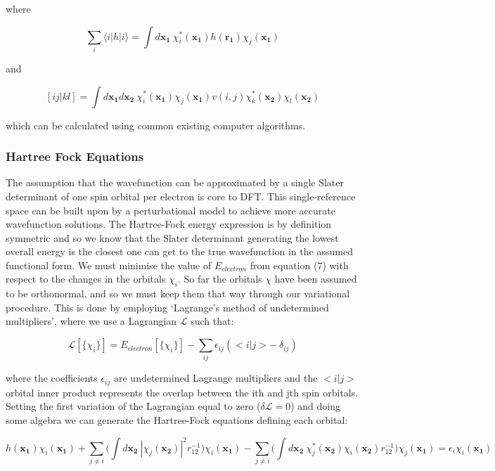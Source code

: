 \documentclass[10pt]{article}
\begin{document}
where

$$\sum_{i}\langle i|h|i\rangle = \int d\mathbf{x_1} \ \chi^*_i(\mathbf{x_1})h(\mathbf{r_1})\chi_j(\mathbf{x_1})$$

and

$$[ij|kl] = \int d\mathbf{x_1} d\mathbf{x_2} \ \chi^*_i(\mathbf{x_1})\chi_j(\mathbf{x_1})v(i,j)\chi^*_k(\mathbf{x_2})\chi_l(\mathbf{x_2})$$

which can be calculated using common existing computer algorithms.

\subsubsection{Hartree Fock Equations}
The assumption that the wavefunction can be approximated by a single Slater determinant of one spin orbital per electron is core to DFT. This single-reference space can be built upon by a perturbational model to achieve more accurate wavefunction solutions. The Hartree-Fock energy expression is by definition symmetric and so we know that the Slater determinant generating the lowest overall energy is the closest one can get to the true wavefunction in the assumed functional form. We must minimise the value of $E_{electron}$ from equation (7) with respect to the changes in the orbitals $\chi_i$. So far the orbitals $\chi$ have been assumed to be orthonormal, and so we must keep them that way through our variational procedure. This is done by employing `Lagrange's method of undetermined multipliers', where we use a Lagrangian $\mathcal{L}$ such
that:

\begin{equation*}
	\mathcal{L}[\{\chi_i\}] = E_{electron}[\{\chi_i\}]-\sum_{ij}\epsilon_{ij}(<i|j>- \ \delta_{ij})
\end{equation*}

where the coefficients $\epsilon_{ij}$ are undetermined Lagrange multipliers and the $<i|j>$ orbital inner product represents the overlap between the ith and jth spin orbitals. Setting the first variation of the Lagrangian equal to zero ($\delta\mathcal{L} = 0$) and doing some algebra we can generate the Hartree-Fock equations defining each orbital:

\begin{equation}
	h(\mathbf{x_1})\chi_i(\mathbf{x_1})+\sum_{j \not= i}\biggr(\int d\mathbf{x_2} \ |\chi_j(\mathbf{x_2})|^2r_{12}^{-1}\biggr)\chi_i(\mathbf{x_1})-\sum_{j \not= i}\biggr(\int d\mathbf{x_2} \ \chi_j^*(\mathbf{x_2})\chi_i(\mathbf{x_2})r_{12}^{-1}\biggr)\chi_j(\mathbf{x_1}) = \epsilon_i\chi_i(\mathbf{x_1})
\end{equation}
\end{document}
